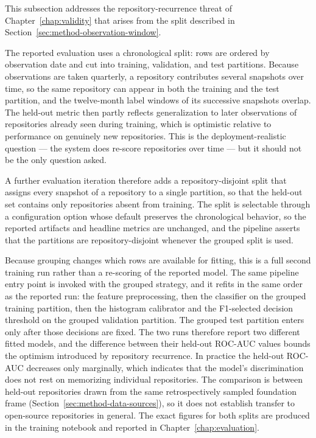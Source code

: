This subsection addresses the repository-recurrence threat of Chapter~\ref{chap:validity} that arises from the split described in Section~\ref{sec:method-observation-window}.

The reported evaluation uses a chronological split: rows are ordered by observation date and cut into training, validation, and test partitions. Because observations are taken quarterly, a repository contributes several snapshots over time, so the same repository can appear in both the training and the test partition, and the twelve-month label windows of its successive snapshots overlap. The held-out metric then partly reflects generalization to later observations of repositories already seen during training, which is optimistic relative to performance on genuinely new repositories. This is the deployment-realistic question --- the system does re-score repositories over time --- but it should not be the only question asked.

A further evaluation iteration therefore adds a repository-disjoint split that assigns every snapshot of a repository to a single partition, so that the held-out set contains only repositories absent from training. The split is selectable through a configuration option whose default preserves the chronological behavior, so the reported artifacts and headline metrics are unchanged, and the pipeline asserts that the partitions are repository-disjoint whenever the grouped split is used.

Because grouping changes which rows are available for fitting, this is a full second training run rather than a re-scoring of the reported model. The same pipeline entry point is invoked with the grouped strategy, and it refits in the same order as the reported run: the feature preprocessing, then the classifier on the grouped training partition, then the histogram calibrator and the F1-selected decision threshold on the grouped validation partition. The grouped test partition enters only after those decisions are fixed. The two runs therefore report two different fitted models, and the difference between their held-out ROC-AUC values bounds the optimism introduced by repository recurrence. In practice the held-out ROC-AUC decreases only marginally, which indicates that the model's discrimination does not rest on memorizing individual repositories. The comparison is between held-out repositories drawn from the same retrospectively sampled foundation frame (Section~\ref{sec:method-data-sources}), so it does not establish transfer to open-source repositories in general. The exact figures for both splits are produced in the training notebook and reported in Chapter~\ref{chap:evaluation}.

